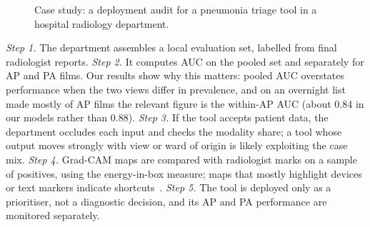 \documentclass[conference]{IEEEtran}
\begin{document}
\begin{figure}[!t]
\centering
{}
\caption{Case study: a deployment audit for a pneumonia triage tool in a hospital radiology department.}
\label{fig:case}
\end{figure}

\textit{Step 1.} The department assembles a local evaluation set, labelled from final radiologist reports. \textit{Step 2.} It computes AUC on the pooled set and separately for AP and PA films. Our results show why this matters: pooled AUC overstates performance when the two views differ in prevalence, and on an overnight list made mostly of AP films the relevant figure is the within-AP AUC (about 0.84 in our models rather than 0.88). \textit{Step 3.} If the tool accepts patient data, the department occludes each input and checks the modality share; a tool whose output moves strongly with view or ward of origin is likely exploiting the case mix. \textit{Step 4.} Grad-CAM maps are compared with radiologist marks on a sample of positives, using the energy-in-box measure; maps that mostly highlight devices or text markers indicate shortcuts~\cite{degrave2021shortcuts}. \textit{Step 5.} The tool is deployed only as a prioritiser, not a diagnostic decision, and its AP and PA performance are monitored separately.
\end{document}
